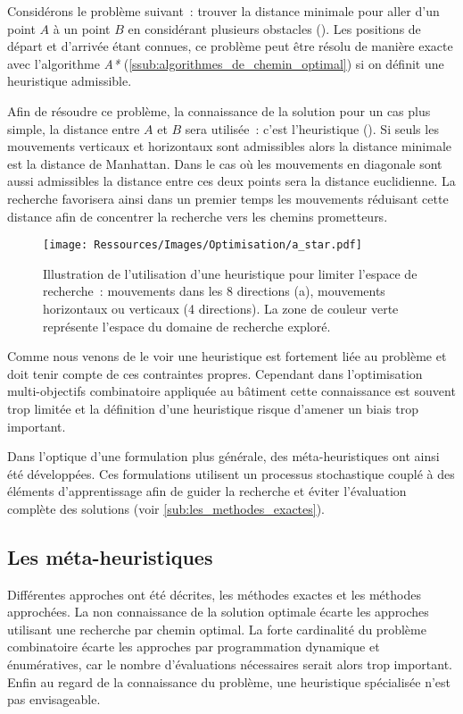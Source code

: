 Considérons le problème suivant~: trouver la distance minimale pour aller d’un point
$A$ à un point $B$ en considérant plusieurs obstacles ().
Les positions de départ et d’arrivée étant connues, ce problème peut être résolu
de manière exacte avec l’algorithme \textit{A*} (\ref{ssub:algorithmes_de_chemin_optimal})
si on définit une heuristique admissible.

Afin de résoudre ce problème, la connaissance de la solution pour un cas plus
simple, la distance entre $A$ et $B$ sera utilisée~: c’est l’heuristique
(). Si seuls les mouvements verticaux et horizontaux sont
admissibles alors la distance minimale est la distance de Manhattan. Dans le cas
où les mouvements en diagonale sont aussi admissibles la distance entre ces deux
points sera la distance euclidienne. La recherche favorisera ainsi dans un
premier temps les mouvements réduisant cette distance afin de concentrer la
recherche vers les chemins prometteurs.

\begin{figure}
    \centering
    \texttt{[image: Ressources/Images/Optimisation/a\_star.pdf]}
    \caption[Illustration de l’utilisation d’une heuristique]
            {Illustration de l’utilisation d’une heuristique pour limiter l’espace
             de recherche~: mouvements dans les 8 directions (a), mouvements
             horizontaux ou verticaux (4 directions). La zone de couleur verte
             représente l’espace du domaine de recherche exploré.}
    \label{fig:a_star}
\end{figure}

Comme nous venons de le voir une heuristique est fortement liée au problème et
doit tenir compte de ces contraintes propres. Cependant dans l’optimisation
multi-objectifs combinatoire appliquée au bâtiment cette connaissance est souvent
trop limitée et la définition d’une heuristique risque d’amener un biais trop
important.

Dans l’optique d’une formulation plus générale, des méta-heuristiques ont ainsi
été développées. Ces formulations utilisent un processus stochastique couplé à des
éléments d’apprentissage afin de guider la recherche et éviter l’évaluation
complète des solutions (voir \ref{sub:les_methodes_exactes}).



\subsection{Les méta-heuristiques} %
\label{sub:les_meta_heuristiques}
Différentes approches ont été décrites, les méthodes exactes et les méthodes approchées.
La non connaissance de la solution optimale écarte les approches utilisant une recherche
par chemin optimal. La forte cardinalité du problème combinatoire écarte les approches par
programmation dynamique et énumératives, car le nombre d’évaluations nécessaires serait
alors trop important. Enfin au regard de la
connaissance du problème, une heuristique spécialisée n’est pas envisageable.

